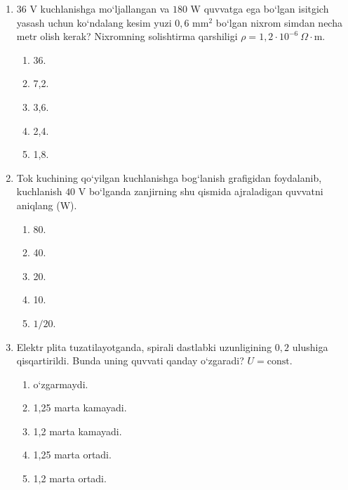 \begin{enumerate}
\item $36$ V kuchlanishga mo‘ljallangan va $180$ W quvvatga ega bo‘lgan isitgich yasash uchun ko‘ndalang kesim yuzi $0,6$ mm$^2$ bo‘lgan nixrom simdan necha metr olish kerak? Nixromning solishtirma qarshiligi $\rho=1,2\cdot10^{-6}~\Omega\cdot$m.
\begin{enumerate}[label=\Alph*)]
\item 36.
\item 7,2.
\item 3,6.
\item 2,4.
\item 1,8.
\end{enumerate}

\item Tok kuchining qo‘yilgan kuchlanishga bog‘lanish grafigidan foydalanib, kuchlanish $40$ V bo‘lganda zanjirning shu qismida ajraladigan quvvatni aniqlang (W).


\begin{enumerate}[label=\Alph*)]
\item 80.
\item 40.
\item 20.
\item 10.
\item $1/20$.
\end{enumerate}

\item Elektr plita tuzatilayotganda, spirali dastlabki uzunligining $0,2$ ulushiga qisqartirildi. Bunda uning quvvati qanday o‘zgaradi? $U=\text{const}$.
\begin{enumerate}[label=\Alph*)]
\item o‘zgarmaydi.
\item 1,25 marta kamayadi.
\item 1,2 marta kamayadi.
\item 1,25 marta ortadi.
\item 1,2 marta ortadi.
\end{enumerate}


\end{enumerate}
